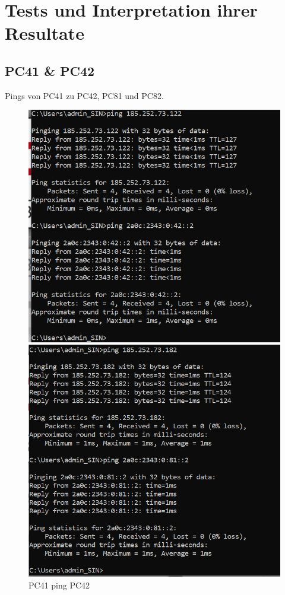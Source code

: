 \documentclass{article}
\begin{document}
\pagebreak
\section{Tests und Interpretation ihrer Resultate}

\subsection{PC41 \& PC42}
Pings von PC41 zu PC42, PC81 und PC82.\\
\begin{figure}[!htp]
  \centering
  \begin{minipage}[b]{0.25\textwidth}
    \includegraphics[width=\textwidth]{Arbeitsergebnisse/pc41/pc41_ping_pc42.PNG}
    \caption{PC41 ping PC42}
  \end{minipage}
  \hspace{0.8cm}
  \begin{minipage}[b]{0.25\textwidth}
    \includegraphics[width=\textwidth]{Arbeitsergebnisse/pc41/pc41_ping_pc81.PNG}

\end{minipage}
\end{figure}
\end{document}
